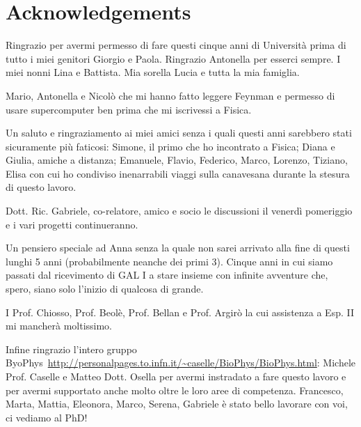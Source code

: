\chapter*{Acknowledgements}
Ringrazio per avermi permesso di fare questi cinque anni di Università prima di tutto i miei genitori Giorgio e Paola.
Ringrazio Antonella per esserci sempre. I miei nonni Lina e Battista. Mia sorella Lucia e tutta la mia famiglia.

Mario, Antonella e Nicolò che mi hanno fatto leggere Feynman e permesso di usare supercomputer ben prima che mi iscrivessi a Fisica.

Un saluto e ringraziamento ai miei amici senza i quali questi anni sarebbero stati sicuramente più faticosi: Simone, il primo che ho incontrato a Fisica; Diana e Giulia, amiche a distanza; Emanuele, Flavio, Federico, Marco, Lorenzo, Tiziano, Elisa con cui ho condiviso inenarrabili viaggi sulla canavesana durante la stesura di questo lavoro.

Dott. Ric. Gabriele, co-relatore, amico e socio le discussioni il venerdì pomeriggio e i vari progetti continueranno.

Un pensiero speciale ad Anna senza la quale non sarei arrivato alla fine di questi lunghi 5 anni (probabilmente neanche dei primi 3). Cinque anni in cui siamo passati dal ricevimento di GAL I a stare insieme con infinite avventure che, spero, siano solo l'inizio di qualcosa di grande.

I Prof. Chiosso, Prof. Beolè, Prof. Bellan e Prof. Argirò la cui assistenza a Esp. II mi mancherà moltissimo.

Infine ringrazio l'intero gruppo ByoPhys~\url{http://personalpages.to.infn.it/~caselle/BioPhys/BioPhys.html}: Michele Prof. Caselle e Matteo Dott. Osella per avermi instradato a fare questo lavoro e per avermi supportato anche molto oltre le loro aree di competenza.
Francesco, Marta, Mattia, Eleonora, Marco, Serena, Gabriele è stato bello lavorare con voi, ci vediamo al PhD!
